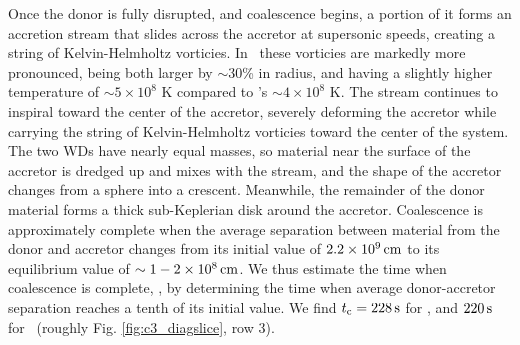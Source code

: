 
Once the donor is fully disrupted, and coalescence begins, a portion of it forms an accretion stream that slides across the accretor at supersonic speeds, creating a string of Kelvin-Helmholtz vorticies.  In \arepo\ these vorticies are markedly more pronounced, being both larger by $\sim30$\% in radius, and having a slightly higher temperature of $\sim5\times10^8$ K compared to \gasoline's $\sim4\times10^8$ K.  The stream continues to inspiral toward the center of the accretor, severely deforming the accretor while carrying the string of Kelvin-Helmholtz vorticies toward the center of the system.  The two WDs have nearly equal masses, so material near the surface of the accretor is dredged up and mixes with the stream, and the shape of the accretor changes from a sphere into a crescent.  Meanwhile, the remainder of the donor material forms a thick sub-Keplerian disk around the accretor.  Coalescence is approximately complete when the average separation between material from the donor and accretor changes from its initial value of $2.2\times10^9\,\mathrm{cm}$ to its equilibrium value of $\sim1-2\times10^8\,\mathrm{cm}$.  We thus estimate the time when coalescence is complete, \tcoal, by determining the time when average donor-accretor separation reaches a tenth of its initial value.  We find $\tcoal = 228\,\mrm{s}$ for \gasoline, and $220\,\mathrm{s}$ for \arepo\ (roughly Fig. \ref{fig:c3_diagslice}, row 3).

